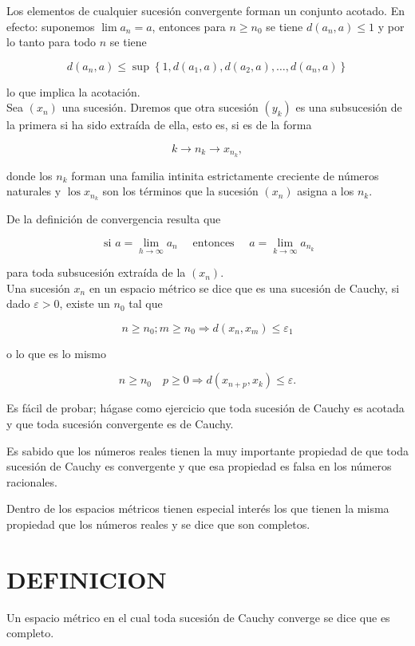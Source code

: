 \documentclass[10pt]{article}
\theoremstyle{plain}
\theoremstyle{definition}
\theoremstyle{remark}
\begin{document}
Los elementos de cualquier sucesión convergente forman un conjunto acotado. En efecto: suponemos $\lim a_{n}=a$, entonces para $n \geqslant n_{0}$ se tiene $d\left(a_{n}, a\right) \leqslant 1$ y por lo tanto para todo $n$ se tiene

$$
d\left(a_{n}, a\right) \leqslant \sup \left\{1, d\left(a_{1}, a\right), d\left(a_{2}, a\right), \ldots, d\left(a_{n}, a\right)\right\}
$$

lo que implica la acotación.\\
Sea $\left(x_{n}\right)$ una sucesión. Dıremos que otra sucesión $\left(y_{k}\right)$ es una subsucesión de la primera si ha sido extraída de ella, esto es, si es de la forma

$$
k \rightarrow n_{k} \rightarrow x_{n_{k}},
$$

donde los $n_{k}$ forman una familia intinita estrictamente creciente de números naturales y $\operatorname{los} x_{n_{k}}$ son los términos que la sucesión $\left(x_{n}\right)$ asigna a los $n_{k}$.

De la definición de convergencia resulta que

$$
\text { si } a=\lim _{h \rightarrow \infty} a_{n} \quad \text { entonces } \quad a=\lim _{k \rightarrow \infty} a_{n_{k}}
$$

para toda subsucesión extraída de la $\left(x_{n}\right)$.\\
Una sucesión $x_{n}$ en un espacio métrico se dice que es una sucesión de Cauchy, si dado $\varepsilon>0$, existe un $n_{0}$ tal que

$$
n \geqslant n_{0} ; m \geqslant n_{0} \Rightarrow d\left(x_{n}, x_{m}\right) \leqslant \varepsilon_{1}
$$

o lo que es lo mismo


$$
n \geqslant n_{0} \quad p \geqslant 0 \Rightarrow d\left(x_{n+p}, x_{k}\right) \leqslant \varepsilon .
$$

Es fácil de probar; hágase como ejercicio que toda sucesión de Cauchy es acotada y que toda sucesión convergente es de Cauchy.

Es sabido que los números reales tienen la muy importante propiedad de que toda sucesión de Cauchy es convergente y que esa propiedad es falsa en los números racionales.

Dentro de los espacios métricos tienen especial interés los que tienen la misma propiedad que los números reales y se dice que son completos.

\section*{DEFINICION}
Un espacio métrico en el cual toda sucesión de Cauchy converge se dice que es completo.
\end{document}
